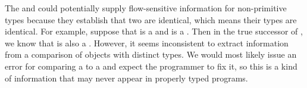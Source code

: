 \begin{workinprogress}
The  and  could potentially supply flow-sensitive
information for 
non-primitive types because they establish that two  are identical, which means their 
types are identical.  For example, suppose that  is a  and  is 
a .  Then
in the true successor of , we know that  is also a 
.  However, it 
seems inconsistent to extract information from a comparison of objects with distinct types.  
We would most likely issue an error for comparing a  to a 
and expect the
programmer to fix it, so this is a kind of information that may never appear in properly typed
programs.
\end{workinprogress}




